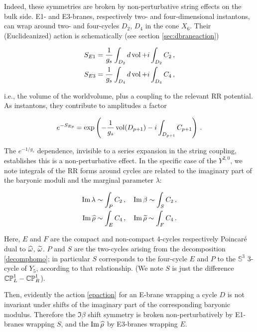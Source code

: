 Indeed, these symmetries are broken by non-perturbative string effects on the bulk side. E1- and E3-branes, respectively two- and four-dimensional instantons, can wrap around two- and four-cycles $D_2$, $D_4$ in the cone $X_6$. Their (Euclideanized) action is schematically (see section \ref{sec:dbraneaction})

\begin{align}
\begin{split}
	S_{E1} = \frac{1}{g_s}\int_{D_2} d\operatorname{vol} + i\int_{D_2} C_2\,,\\
	S_{E3} = \frac{1}{g_s}\int_{D_4} d\operatorname{vol} + i\int_{D_4} C_4\,,
	\label{epaction}
\end{split}
\end{align}

i.e., the volume of the worldvolume, plus a coupling to the relevant RR potential. As instantons, they contribute to amplitudes a factor

\begin{equation}
	e^{-S_{Ep}} = \exp\left({-\frac{1}{g_s}\operatorname{vol}(D_{p+1}) - i\int_{D_{p+1}} C_{p+1} }\right)\,.
\end{equation}

The $e^{-1/g_s}$ dependence, invisible to a series expansion in the string coupling, establishes this is a non-perturbative effect. In the specific case of the $Y^{2,0}$, we note integrals of the RR forms around cycles are related to the imaginary part of the baryonic moduli and the marginal parameter $\lambda$:

\begin{align}
\begin{split}
	\operatorname{Im} \lambda \sim \int_{P} C_2\,,\quad	\operatorname{Im} \beta \sim \int_{S} C_2\,, \\
	\operatorname{Im} \widehat{\rho} \sim \int_{E} C_4\,,\quad	\operatorname{Im} \widetilde{\rho} \sim \int_{F} C_4\,.
\end{split}
\end{align}

Here, $E$ and $F$ are the compact and non-compact 4-cycles respectively Poincar\'e dual to $\widehat{\omega}$, $\widetilde{\omega}$. $P$ and $S$ are the two-cycles arising from the decomposition \eqref{decomphomo}; in particular $S$ corresponds to the four-cycle $E$ and $P$ to the $\mathbb{S}^3$ 3-cycle of $Y_5$, according to that relationship. (We note $S$ is just the difference $\mathbb{CP}^1_L - \mathbb{CP}^1_R$).

Then, evidently the action \eqref{epaction} for an E-brane wrapping a cycle $D$ is not invariant under shifts of the imaginary part of the corresponding baryonic modulus. Therefore the $\Im\beta$ shift symmetry is broken non-perturbatively by E1-branes wrapping $S$, and the $\operatorname{Im}\widehat{\rho}$ by E3-branes wrapping $E$.

